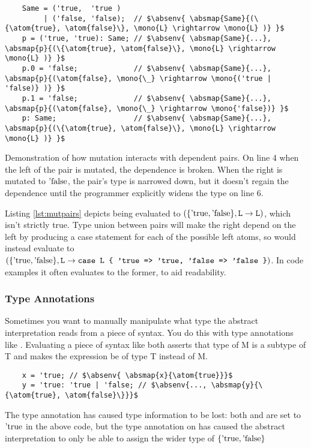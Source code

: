 \documentclass[12pt,twoside]{report}
\begin{document}
\begin{listing}[H]
  \begin{verbatim}
    Same = ('true,  'true )
         | ('false, 'false);  // $\absenv{ \absmap{Same}{(\{\atom{true}, \atom{false}\}, \mono{L} \rightarrow \mono{L} )} }$
    p = ('true, 'true): Same; // $\absenv{ \absmap{Same}{...}, \absmap{p}{(\{\atom{true}, \atom{false}\}, \mono{L} \rightarrow \mono{L} )} }$
    p.0 = 'false;             // $\absenv{ \absmap{Same}{...}, \absmap{p}{(\atom{false}, \mono{\_} \rightarrow \mono{('true | 'false)} )} }$
    p.1 = 'false;             // $\absenv{ \absmap{Same}{...}, \absmap{p}{(\atom{false}, \mono{\_} \rightarrow \mono{'false})} }$
    p: Same;                  // $\absenv{ \absmap{Same}{...}, \absmap{p}{(\{\atom{true}, \atom{false}\}, \mono{L} \rightarrow \mono{L} )} }$
  \end{verbatim}
  \caption{Demonstration of how mutation interacts with dependent pairs. On line 4 when the left of the pair is mutated, the dependence is broken. When the right is mutated to $\atom{false}$, the pair's type is narrowed down, but it doesn't regain the dependence until the programmer explicitly widens the type on line 6.}
  \label{lst:mutpairs}
\end{listing}

Listing \ref{lst:mutpairs} depicts  being evaluated to $(\{\text{'true}, \text{'false}\}, \text{\texttt{L}} \rightarrow \text{\texttt{L}})$, which isn't strictly true. Type union between pairs will make the right depend on the left by producing a case statement for each of the possible left atoms, so  would instead evaluate to $(\{\text{'true}, \text{'false}\}, \text{\texttt{L}} \rightarrow \text{\texttt{case L \{ 'true => 'true, 'false => 'false \}}})$. In code examples it often evaluates to the former, to aid readability.

\subsubsection{Type Annotations}
Sometimes you want to manually manipulate what type the abstract interpretation reads from a piece of syntax. You do this with type annotations like . Evaluating a piece of syntax like  both asserts that type of M is a subtype of T and makes the expression be of type T instead of M.

\begin{listing}[H]
  \begin{verbatim}
    x = 'true; // $\absenv{ \absmap{x}{\atom{true}}}$
    y = 'true: 'true | 'false; // $\absenv{..., \absmap{y}{\{\atom{true}, \atom{false}\}}}$
  \end{verbatim}
  \caption{The type annotation has caused type information to be lost: both  and  are set to $\atom{true}$ in the above code, but the type annotation on  has caused the abstract interpretation to only be able to assign the wider type of $\{ \atom{true}, \atom{false} \}$}
\end{listing}
\end{document}
